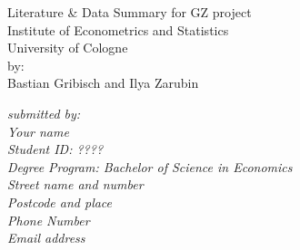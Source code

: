 \documentclass[a4paper,12pt]{scrartcl} %
\begin{document}




\begin{titlepage}

\thispagestyle{empty}   %


\begin{center}
\vspace*{2.cm}
{\textbf  \Large Literature \& Data Summary for GZ project} \\
\vspace*{2cm}
\vspace{0.5cm}
Institute of Econometrics and Statistics\\
University of Cologne\\
\vspace*{0.5cm}
by:\\
Bastian Gribisch and Ilya Zarubin\\
\vspace*{0.5cm}

\end{center}


\vfill
\begin{flushright}
   \emph{submitted by:} \\
   \emph{Your name} \\
   \emph{Student ID: ????}\\
    \emph{Degree Program: Bachelor of Science in Economics}\\
   \vspace*{0.5cm}
    \emph{Street name and number}\\
    \emph{Postcode and place}\\
   \emph{Phone Number}\\
   \emph{Email address}\\
\end{flushright}


\end{titlepage}
\end{document}
